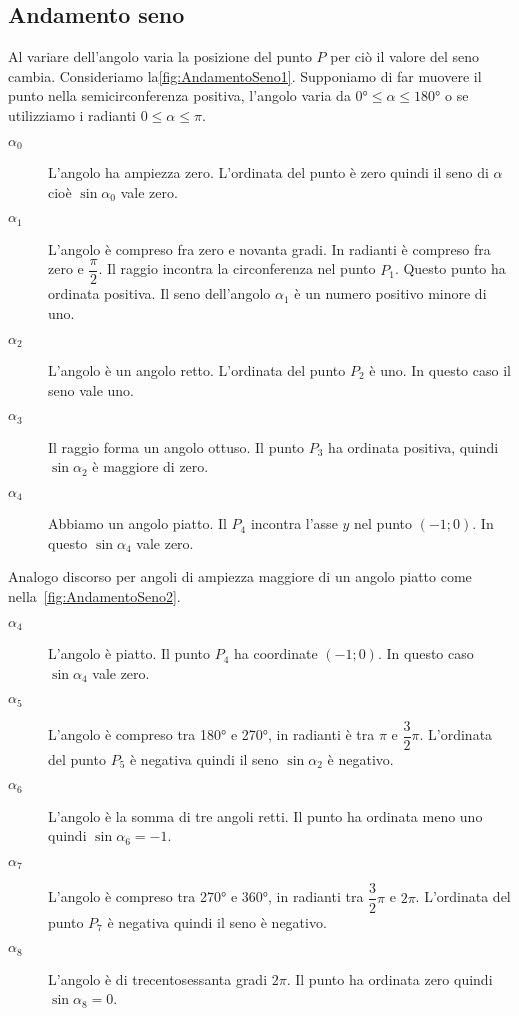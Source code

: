 \subsection{Andamento seno}
\label{subs:AndamentoSeno}
Al variare dell'angolo varia la posizione del punto $P$ per ciò il valore del seno cambia. Consideriamo la\nobs\vref{fig:AndamentoSeno1}. Supponiamo di far muovere il punto nella semicirconferenza positiva, l'angolo varia da $\ang{0}\leq\alpha\leq\ang{180}$ o se utilizziamo i radianti $0\leq\alpha\leq\pi$. 
\begin{description}
	\item[$\alpha_0$] L'angolo ha ampiezza zero. L'ordinata del punto è zero quindi il seno di $\alpha$ cioè $\sin\alpha_0$ vale zero.
	\item [$\alpha_1$] L'angolo è compreso fra zero e novanta gradi. In radianti è compreso fra zero e $\dfrac{\pi}{2} $. Il raggio incontra la circonferenza nel punto $P_1$. Questo punto ha ordinata positiva. Il seno dell'angolo $\alpha_1$ è un numero positivo minore di uno.
	\item [$\alpha_2$] L'angolo è un angolo retto. L'ordinata del punto $P_2$ è uno. In questo caso il seno vale uno. 
	\item [$\alpha_3$] Il raggio forma un angolo ottuso. Il punto $P_3$ ha ordinata positiva, quindi $\sin\alpha_2$ è maggiore di zero.
	\item [$\alpha_4$] Abbiamo un angolo piatto. Il $P_4$ incontra l'asse $y$ nel punto $(-1;0)$. In questo $\sin\alpha_4$ vale zero.
\end{description}
Analogo discorso per angoli di ampiezza maggiore di un angolo piatto come nella~\vref{fig:AndamentoSeno2}.
\begin{description}
	\item [$\alpha_4$] L'angolo è piatto. Il punto $P_4$ ha coordinate $(-1;0)$. In questo caso $\sin\alpha_4$ vale zero.
	\item [$\alpha_5$] L'angolo è compreso tra \ang{180} e \ang{270}, in radianti è tra $\pi$ e $\dfrac{3}{2}\pi$. L'ordinata del punto $P_5$ è negativa quindi il seno $\sin\alpha_2$ è negativo.
	\item [$\alpha_6$] L'angolo è la somma di tre angoli retti. Il punto ha ordinata meno uno quindi $\sin\alpha_6=-1$.
	\item [$\alpha_7$] L'angolo è compreso tra \ang{270} e \ang{360}, in radianti tra $\dfrac{3}{2}\pi$ e $2\pi$. L'ordinata del punto $P_7$ è negativa quindi il seno è negativo.
	\item [$\alpha_8$] L'angolo è di trecentosessanta gradi $2\pi$. Il punto ha ordinata zero quindi $\sin\alpha_8=0$.
\end{description}
